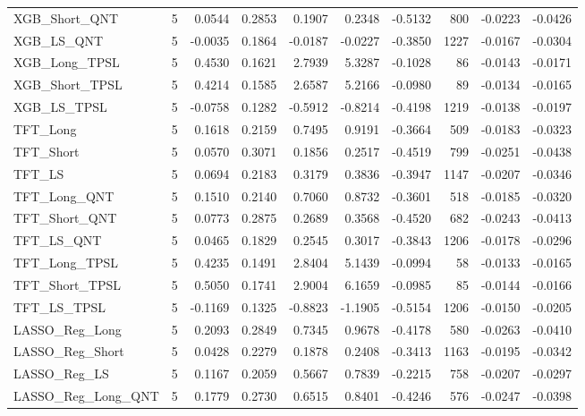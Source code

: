 \begin{tabular}{llrrrrrrrr}
\cline{1-10}
XGB\_Short\_QNT & 5 & 0.0544 & 0.2853 & 0.1907 & 0.2348 & -0.5132 & 800 & -0.0223 & -0.0426 \\
\cline{1-10}
XGB\_LS\_QNT & 5 & -0.0035 & 0.1864 & -0.0187 & -0.0227 & -0.3850 & 1227 & -0.0167 & -0.0304 \\
\cline{1-10}
XGB\_Long\_TPSL & 5 & 0.4530 & 0.1621 & 2.7939 & 5.3287 & -0.1028 & 86 & -0.0143 & -0.0171 \\
\cline{1-10}
XGB\_Short\_TPSL & 5 & 0.4214 & 0.1585 & 2.6587 & 5.2166 & -0.0980 & 89 & -0.0134 & -0.0165 \\
\cline{1-10}
XGB\_LS\_TPSL & 5 & -0.0758 & 0.1282 & -0.5912 & -0.8214 & -0.4198 & 1219 & -0.0138 & -0.0197 \\
\cline{1-10}
TFT\_Long & 5 & 0.1618 & 0.2159 & 0.7495 & 0.9191 & -0.3664 & 509 & -0.0183 & -0.0323 \\
\cline{1-10}
TFT\_Short & 5 & 0.0570 & 0.3071 & 0.1856 & 0.2517 & -0.4519 & 799 & -0.0251 & -0.0438 \\
\cline{1-10}
TFT\_LS & 5 & 0.0694 & 0.2183 & 0.3179 & 0.3836 & -0.3947 & 1147 & -0.0207 & -0.0346 \\
\cline{1-10}
TFT\_Long\_QNT & 5 & 0.1510 & 0.2140 & 0.7060 & 0.8732 & -0.3601 & 518 & -0.0185 & -0.0320 \\
\cline{1-10}
TFT\_Short\_QNT & 5 & 0.0773 & 0.2875 & 0.2689 & 0.3568 & -0.4520 & 682 & -0.0243 & -0.0413 \\
\cline{1-10}
TFT\_LS\_QNT & 5 & 0.0465 & 0.1829 & 0.2545 & 0.3017 & -0.3843 & 1206 & -0.0178 & -0.0296 \\
\cline{1-10}
TFT\_Long\_TPSL & 5 & 0.4235 & 0.1491 & 2.8404 & 5.1439 & -0.0994 & 58 & -0.0133 & -0.0165 \\
\cline{1-10}
TFT\_Short\_TPSL & 5 & 0.5050 & 0.1741 & 2.9004 & 6.1659 & -0.0985 & 85 & -0.0144 & -0.0166 \\
\cline{1-10}
TFT\_LS\_TPSL & 5 & -0.1169 & 0.1325 & -0.8823 & -1.1905 & -0.5154 & 1206 & -0.0150 & -0.0205 \\
\cline{1-10}
LASSO\_Reg\_Long & 5 & 0.2093 & 0.2849 & 0.7345 & 0.9678 & -0.4178 & 580 & -0.0263 & -0.0410 \\
\cline{1-10}
LASSO\_Reg\_Short & 5 & 0.0428 & 0.2279 & 0.1878 & 0.2408 & -0.3413 & 1163 & -0.0195 & -0.0342 \\
\cline{1-10}
LASSO\_Reg\_LS & 5 & 0.1167 & 0.2059 & 0.5667 & 0.7839 & -0.2215 & 758 & -0.0207 & -0.0297 \\
\cline{1-10}
LASSO\_Reg\_Long\_QNT & 5 & 0.1779 & 0.2730 & 0.6515 & 0.8401 & -0.4246 & 576 & -0.0247 & -0.0398 \\

\end{tabular}
